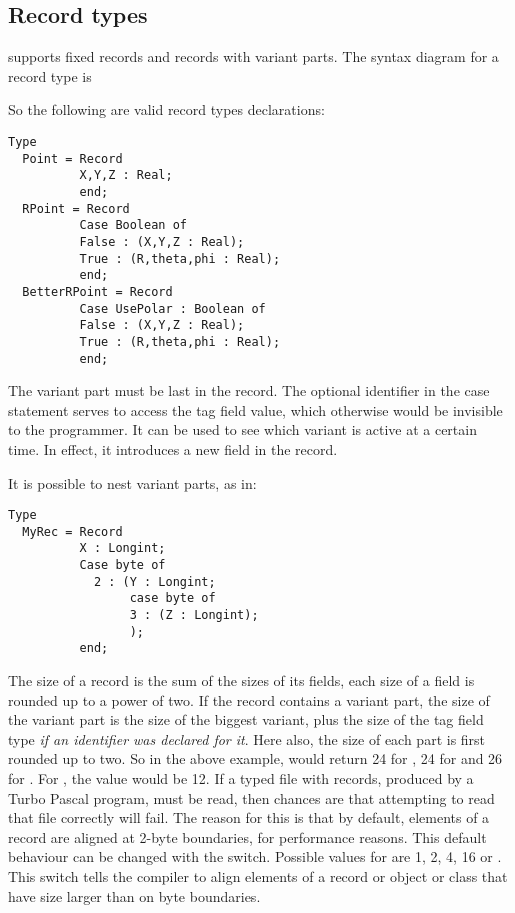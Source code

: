\subsection{Record types}
\fpc supports fixed records and records with variant parts.
The syntax diagram for a record type is

So the following are valid record types declarations:
\begin{verbatim}
Type
  Point = Record
          X,Y,Z : Real;
          end;
  RPoint = Record
          Case Boolean of
          False : (X,Y,Z : Real);
          True : (R,theta,phi : Real);
          end;
  BetterRPoint = Record
          Case UsePolar : Boolean of
          False : (X,Y,Z : Real);
          True : (R,theta,phi : Real);
          end;
\end{verbatim}
The variant part must be last in the record. The optional identifier in the
case statement serves to access the tag field value, which otherwise would
be invisible to the programmer. It can be used to see which variant is
active at a certain time. In effect, it introduces a new field in the
record.
\begin{remark}
It is possible to nest variant parts, as in:
\begin{verbatim}
Type
  MyRec = Record
          X : Longint;
          Case byte of
            2 : (Y : Longint;
                 case byte of
                 3 : (Z : Longint);
                 );
          end;
\end{verbatim}
\end{remark}
The size of a record is the sum of the sizes of its fields, each size of a
field is rounded up to a power of two. If the record contains a variant part, the size
of the variant part is the size of the biggest variant, plus the size of the
tag field type {\em if an identifier was declared for it}. Here also, the size of
each part is first rounded up to two. So in the above example,
 would return 24 for , 24 for  and
26 for . For , the value would be 12.
If a typed file with records, produced by a Turbo Pascal program, must be read,
then chances are that attempting to read that file correctly will fail.
The reason for this is that by default, elements of a record are aligned at
2-byte boundaries, for performance reasons. This default behaviour can be
changed with the  switch. Possible values for
 are 1, 2, 4, 16 or .
This switch tells the compiler to align elements of a record or object or
class that have size larger than  on  byte boundaries.
